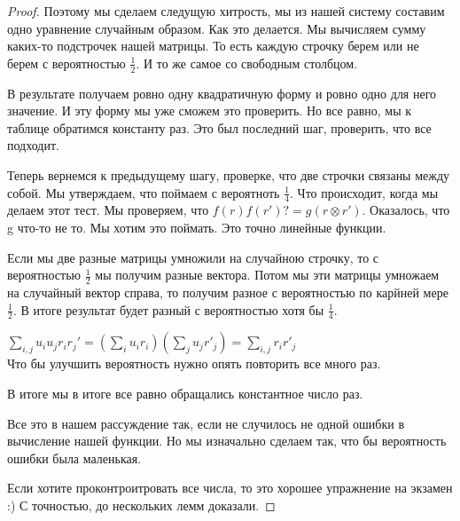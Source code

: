 \begin{proof}
	Поэтому мы сделаем следущую хитрость, мы из нашей систему составим одно уравнение случайным образом. 
	Как это делается. Мы вычисляем сумму каких-то подстрочек нашей матрицы. То есть 
	каждую строчку берем или не берем с вероятностью $\frac{1}{2}$. И то же самое со свободным столбцом.

	В результате получаем ровно одну квадратичную форму и ровно одно для него значение. И эту форму
	мы уже сможем это проверить. Но все равно, мы к таблице обратимся константу раз.  
	Это был последний шаг, проверить, что все подходит. 

	Теперь вернемся к предыдущему шагу, проверке, что две строчки связаны между собой.  
	Мы утверждаем, что поймаем с вероятноть $\frac{1}{4}$. Что происходит, когда мы делаем
	этот тест. Мы проверяем, что $f(r)f(r') ?= g(r \otimes r')$. Оказалось, что g что-то не то. 
	Мы хотим это поймать. Это точно линейные функции. 
	
	Если мы две разные матрицы умножили на случайною строчку, то с вероятностью $\frac{1}{2}$
	мы получим разные вектора. Потом мы эти матрицы умножаем на случайный вектор справа, то 
	получим разное с вероятностью по карйней мере $\frac{1}{2}$. В итоге результат 
	будет разный с вероятностью хотя бы $\frac{1}{4}$.
	
	$\sum_{i,j}u_iu_j r_ir_j' = (\sum_{i}u_ir_i)(\sum_{j}u_jr'_j) = \sum_{i,j}r_ir'_j$\\

	Что бы улучшить вероятность нужно опять повторить все много раз. 

	В итоге мы в итоге все равно обращались константное число раз.

	Все это  в нашем рассуждение так, если не случилось не одной ошибки в вычисление нашей функции. 
	Но мы изначально сделаем так, что бы вероятность ошибки была маленькая. 

	Если хотите проконтроитровать все числа, то это хорошее упражнение на экзамен :)
	С точностью, до нескольких лемм доказали. 
\end{proof}                                      
